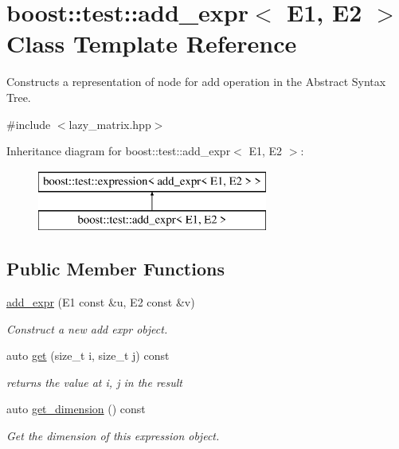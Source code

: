 \hypertarget{classboost_1_1test_1_1add__expr}{}\section{boost\+::test\+::add\+\_\+expr$<$ E1, E2 $>$ Class Template Reference}
\label{classboost_1_1test_1_1add__expr}


Constructs a representation of node for add operation in the Abstract Syntax Tree.  




{\ttfamily \#include $<$lazy\+\_\+matrix.\+hpp$>$}

Inheritance diagram for boost\+::test\+::add\+\_\+expr$<$ E1, E2 $>$\+:\begin{figure}[H]
\begin{center}
\leavevmode
\includegraphics[height=2.000000cm]{classboost_1_1test_1_1add__expr}
\end{center}
\end{figure}
\subsection*{Public Member Functions}
\begin{DoxyCompactItemize}
\item 
\mbox{\hyperlink{classboost_1_1test_1_1add__expr_af71312b5da7142245e8aaa7b3f0f1889}{add\+\_\+expr}} (E1 const \&u, E2 const \&v)
\begin{DoxyCompactList}\small\item\em Construct a new add expr object. \end{DoxyCompactList}\item 
auto \mbox{\hyperlink{classboost_1_1test_1_1add__expr_a6425a9eb0f228262e2f7d5e2b9cb6d21}{get}} (size\+\_\+t i, size\+\_\+t j) const
\begin{DoxyCompactList}\small\item\em returns the value at i, j in the result \end{DoxyCompactList}\item 
auto \mbox{\hyperlink{classboost_1_1test_1_1add__expr_aff48943113526440d4cae9b62492092f}{get\+\_\+dimension}} () const
\begin{DoxyCompactList}\small\item\em Get the dimension of this expression object. \end{DoxyCompactList}\end{DoxyCompactItemize}



